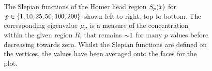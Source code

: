 \begin{figure}[htpb]
	\hfill
	\caption[
		Some Slepian functions of the Homer head region
	]{
		The Slepian functions of the Homer head region \({S}_{p}(x)\) for \(p \in \{1, 10, 25, 50, 100, 200\}\) shown left-to-right, top-to-bottom.
		The corresponding eigenvalue \({\mu}_{p}\) is a measure of the concentration within the given region \(R\), that remains \({\thicksim}\num{1}\) for many \(p\) values before decreasing towards zero.
		Whilst the Slepian functions are defined on the vertices, the values have been averaged onto the faces for the plot.
	}\label{fig:chapter5_slepian_functions}
\end{figure}
